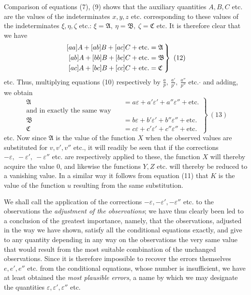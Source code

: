 Comparison of equations (7), (9) shows that the auxiliary quantities \(A,B,C\) etc. are the values of the indeterminates \(x,y,z\) etc. corresponding to these values of the indeterminates \(\xi,\eta,\zeta\) etc.: \(\xi=\mathfrak A,\ \eta=\mathfrak B,\ \zeta=\mathfrak C\) etc. It is therefore clear that we have
\[
\left.\begin{aligned}\relax
[aa]A+[ab]B+[ac]C+\text{etc.}&=\mathfrak A\\
[ab]A+[bb]B+[bc]C+\text{etc.}&=\mathfrak B\\
[ac]A+[bc]B+[cc]C+\text{etc.}&=\mathfrak C
\end{aligned}\right\}\ (12)
\]
etc. Thus, multiplying equations (10) respectively by \(\frac ap,\ \frac{a'}{p'},\ \frac{a''}{p''}\) etc.\(\cdot\) and adding, we obtain
\[
\left.\begin{aligned}
\mathfrak A&=a\varepsilon+a'\varepsilon'+a''\varepsilon''+\text{etc.}\\
\text{and in exactly the same way}\quad&\\
\mathfrak B&=b\varepsilon+b'\varepsilon'+b''\varepsilon''+\text{etc.}\\
\mathfrak C&=c\varepsilon+c'\varepsilon'+c''\varepsilon''+\text{etc.}
\end{aligned}\right\}\ (13)
\]
etc. Now since \(\mathfrak A\) is the value of the function \(X\) when the observed values are substituted for \(v,v',v''\) etc., it will readily be seen that if the corrections \(-\varepsilon,\ -\varepsilon',\ -\varepsilon''\) etc. are respectively applied to these, the function \(X\) will thereby acquire the value \(0\), and likewise the functions
\(Y,Z\) etc. will thereby be reduced to a vanishing value. In a similar way it follows from equation (11) that \(K\) is the value of the function \(u\) resulting from the same substitution.

We shall call the application of the corrections \(-\varepsilon,-\varepsilon',-\varepsilon''\) etc. to the observations the \textit{adjustment of the observations}; we have thus clearly been led to a conclusion of the greatest importance, namely, that the observations, adjusted in the way we have shown, satisfy all the conditional equations exactly, and give to any quantity depending in any way on the observations the very same value that would result from the most suitable combination of the unchanged observations. Since it is therefore impossible to recover the errors themselves \(e,e',e''\) etc. from the conditional equations, whose number is insufficient, we have at least obtained the \textit{most plausible errors}, a name by which we may designate the quantities \(\varepsilon,\varepsilon',\varepsilon''\) etc.

